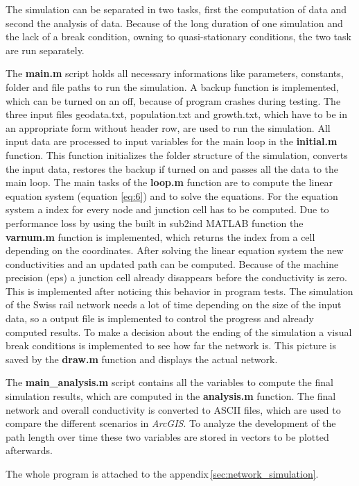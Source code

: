\documentclass[11pt]{scrartcl}
\begin{document}
The simulation can be separated in two tasks, first the computation of data and second the analysis of data. Because of the long duration of one simulation and the lack of a break condition, owning to quasi-stationary conditions, the two task are run separately.

The \textbf{main.m} script holds all necessary informations like parameters, constants, folder and file paths to run the simulation. A backup function is implemented, which can be turned on an off, because of program crashes during testing. The three input files geodata.txt, population.txt and growth.txt, which have to be in an appropriate form without header row, are used to run the simulation. All input data are processed to input variables for the main loop in the \textbf{initial.m} function. This function initializes the folder structure of the simulation, converts the input data, restores the backup if turned on and passes all the data to the main loop. The main tasks of the \textbf{loop.m} function are to compute the linear equation system (equation \ref{eq:6}) and to solve the equations. For the equation system a index for every node and junction cell has to be computed. Due to performance loss by using the built in sub2ind MATLAB function the \textbf{varnum.m} function is implemented, which returns the index from a cell depending on the coordinates. After solving the linear equation system the new conductivities and an updated path can be computed. Because of the machine precision (eps) a junction cell already disappears before the conductivity is zero. This is implemented after noticing this behavior in program tests. The simulation of the Swiss rail network needs a lot of time depending on the size of the input data, so a output file is implemented to control the progress and already computed results. To make a decision about the ending of the simulation a visual break conditions is implemented to see how far the network is. This picture is saved by the \textbf{draw.m} function and displays the actual network.

The \textbf{main\_analysis.m} script contains all the variables to compute the final simulation results, which are computed in the \textbf{analysis.m} function. The final network and overall conductivity is converted to ASCII files, which are used to compare the different scenarios in \textit{ArcGIS}. To analyze the development of the path length over time these two variables are stored in vectors to be plotted afterwards.

The whole program is attached to the appendix\,\ref{sec:network_simulation}.
\end{document}
